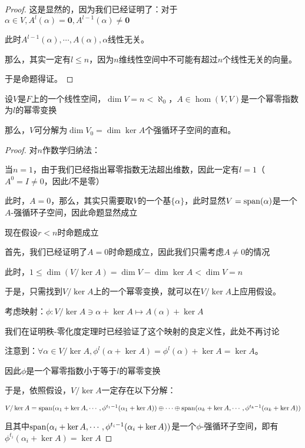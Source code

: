 \documentclass[12pt, a4paper, oneside, UTF8]{ctexbook}
\begin{document}
			\begin{proof}
				这是显然的，因为我们已经证明了：对于$\alpha \in V,A^l(\alpha )=\mathbf{0},A^{l-1}(\alpha )\neq \mathbf{0}$

				此时$A^{l-1}(\alpha ),\cdots,A(\alpha ),\alpha $线性无关。

				那么，其实一定有$l \leqslant n$，因为$n$维线性空间中不可能有超过$n$个线性无关的向量。

				于是命题得证。
			\end{proof}
			\begin{lemma}{}
				设$V$是$F$上的一个线性空间，$\dim V = n < \aleph_0$，$A \in \hom(V,V)$是一个幂零指数为$l$的幂零变换

				那么，$V$可分解为$\dim V_0 = \dim \ker A$个强循环子空间的直和。
			\end{lemma}
			\begin{proof}
				对$n$作数学归纳法：

				当$n=1$，由于我们已经指出幂零指数无法超出维数，因此一定有$l=1$（$A^0=I\neq 0$，因此$l$不是零）

				此时，$A=0$，那么，其实只需要取$V$的一个基$\{\alpha \}$，此时显然$V=\operatorname{span}(\alpha)$是一个$A$-强循环子空间，因此命题显然成立

				现在假设$r< n$时命题成立

				首先，我们已经证明了$A=0$时命题成立，因此我们只需考虑$A \neq 0$的情况

				此时，$1 \leqslant \dim(V/\ker A) = \dim V - \dim \ker A< \dim V=n$

				于是，只需找到$V/\ker A$上的一个幂零变换，就可以在$V/\ker A$上应用假设。

				考虑映射：$\phi  : V/\ker A \ni \alpha + \ker A \mapsto A(\alpha )+\ker A$

				我们在证明秩-零化度定理时已经验证了这个映射的良定义性，此处不再讨论

				注意到：$\forall \alpha \in V/\ker A,\phi^l(\alpha+\ker A)=\phi ^l(\alpha )+\ker A = \ker A$。

				因此$\phi $是一个幂零指数小于等于$l$的幂零变换

				于是，依照假设，$V/\ker A$一定存在以下分解：

				$V/\ker A = \operatorname{span}(\alpha_1+\ker A,\cdots,\phi^{t_1-1}(\alpha_1+\ker A))\oplus \cdots \oplus \operatorname{span}(\alpha_k+\ker A,\cdots,\phi^{t_k-1}(\alpha_k+\ker A))$

				且其中$\operatorname{span}(\alpha_i+\ker A,\cdots,\phi^{t_i-1}(\alpha_i+\ker A))$是一个$\phi $-强循环子空间，即有 $\phi^{t_i}(\alpha_i+\ker A)=\ker A$


\end{proof}
\end{document}
